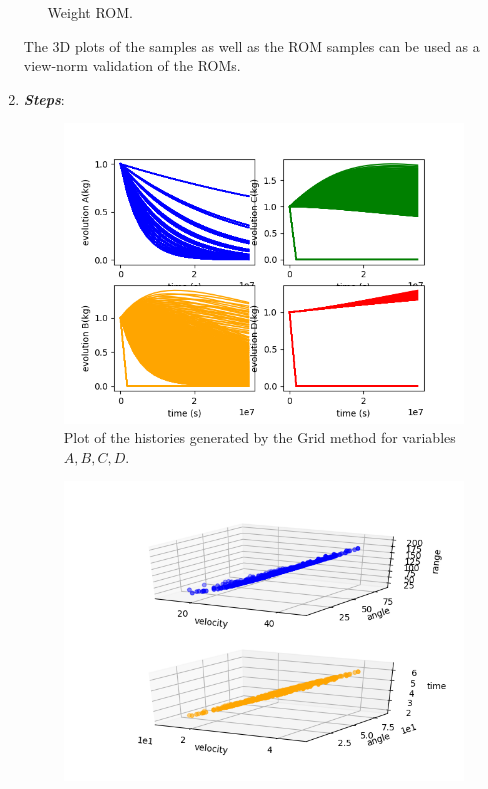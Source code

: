 \begin{enumerate}
\begin{itemize}
         Weight ROM.
     \end{itemize}
     The 3D plots of the samples as well as the ROM samples can be used as a view-norm validation of the ROMs.
   \item \textbf{\textit{Steps}}:
 \begin{figure}[h!]
  \centering
  \includegraphics[scale=0.7]{../../tests/framework/user_guide/ReducedOrderModeling/gold/ROMConstruction/1-historyPlot_line-line-line-line.png}
  \caption{Plot of the histories generated by the Grid method for variables $A,B,C,D$.}
  \label{fig:ROMgrid_histories}
 \end{figure}
 \begin{figure}[h!]
  \centering
  \includegraphics[scale=0.7]{../../tests/framework/user_guide/ReducedOrderModeling/gold/ROMConstruction/1-samplesPlot3DROMgp_scatter-scatter.png}

\end{figure}
\end{enumerate}
